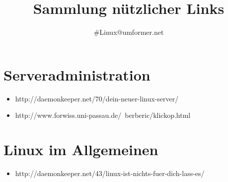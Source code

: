 \documentclass[oneside,12pt,a4paper]{scrartcl}
\title{Sammlung nützlicher Links}
\author{\#Linux@umformer.net}
\begin{document}
\maketitle

\tableofcontents


\section{Serveradministration}
\begin{itemize}
\item http://daemonkeeper.net/70/dein-neuer-linux-server/
\item http://www.forwiss.uni-passau.de/~berberic/klickop.html
\end{itemize}

\section{Linux im Allgemeinen}
\begin{itemize}
\item http://daemonkeeper.net/43/linux-ist-nichts-fuer-dich-lass-es/
\end{itemize}
\end{document}
